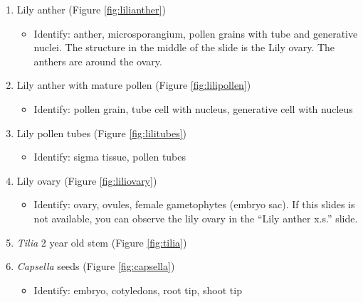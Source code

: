 \documentclass[]{book}
\providecommand{\tightlist}{%
  \setlength{\itemsep}{0pt}\setlength{\parskip}{0pt}}
\begin{document}
\begin{enumerate}
\def\labelenumi{\arabic{enumi}.}
\tightlist
\item
  Lily anther (Figure \ref{fig:lilianther})

  \begin{itemize}
  \tightlist
  \item
    Identify: anther, microsporangium, pollen grains with tube and generative nuclei. The structure in the middle of the slide is the Lily ovary. The anthers are around the ovary.
  \end{itemize}
\item
  Lily anther with mature pollen (Figure \ref{fig:lilipollen})

  \begin{itemize}
  \tightlist
  \item
    Identify: pollen grain, tube cell with nucleus, generative cell with nucleus
  \end{itemize}
\item
  Lily pollen tubes (Figure \ref{fig:lilitubes})

  \begin{itemize}
  \tightlist
  \item
    Identify: sigma tissue, pollen tubes
  \end{itemize}
\item
  Lily ovary (Figure \ref{fig:liliovary})

  \begin{itemize}
  \tightlist
  \item
    Identify: ovary, ovules, female gametophytes (embryo sac). If this slides is not available, you can observe the lily ovary in the ``Lily anther x.s.'' slide.
  \end{itemize}
\item
  \emph{Tilia} 2 year old stem (Figure \ref{fig:tilia})
\item
  \emph{Capsella} seeds (Figure \ref{fig:capsella})

  \begin{itemize}
  \tightlist
  \item
    Identify: embryo, cotyledons, root tip, shoot tip
  \end{itemize}
\end{enumerate}
\end{document}
